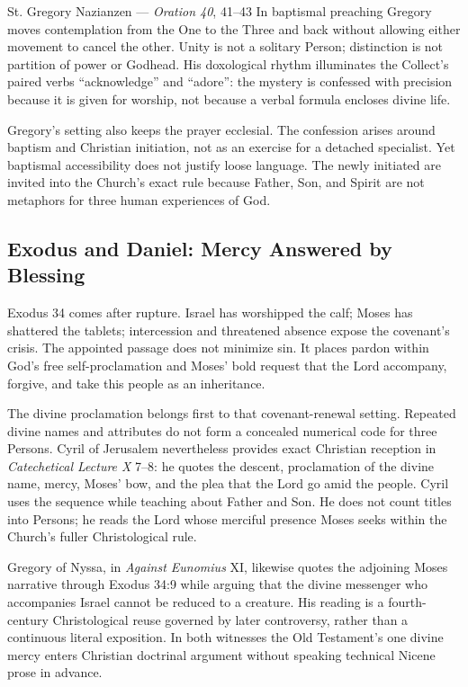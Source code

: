 \begin{sourcecard}{St. Gregory Nazianzen --- \emph{Oration 40}, 41--43}
In baptismal preaching Gregory moves contemplation from the One to the Three and back without allowing either movement to cancel the other. Unity is not a solitary Person; distinction is not partition of power or Godhead. His doxological rhythm illuminates the Collect's paired verbs “acknowledge” and “adore”: the mystery is confessed with precision because it is given for worship, not because a verbal formula encloses divine life.
\end{sourcecard}

Gregory's setting also keeps the prayer ecclesial. The confession arises around baptism and Christian initiation, not as an exercise for a detached specialist. Yet baptismal accessibility does not justify loose language. The newly initiated are invited into the Church's exact rule because Father, Son, and Spirit are not metaphors for three human experiences of God.

\subsection*{Exodus and Daniel: Mercy Answered by Blessing\enspace{}}

Exodus 34 comes after rupture. Israel has worshipped the calf; Moses has shattered the tablets; intercession and threatened absence expose the covenant's crisis. The appointed passage does not minimize sin. It places pardon within God's free self-proclamation and Moses' bold request that the Lord accompany, forgive, and take this people as an inheritance.

The divine proclamation belongs first to that covenant-renewal setting. Repeated divine names and attributes do not form a concealed numerical code for three Persons. Cyril of Jerusalem nevertheless provides exact Christian reception in \emph{Catechetical Lecture X} 7--8: he quotes the descent, proclamation of the divine name, mercy, Moses' bow, and the plea that the Lord go amid the people. Cyril uses the sequence while teaching about Father and Son. He does not count titles into Persons; he reads the Lord whose merciful presence Moses seeks within the Church's fuller Christological rule.

Gregory of Nyssa, in \emph{Against Eunomius} XI, likewise quotes the adjoining Moses narrative through Exodus 34:9 while arguing that the divine messenger who accompanies Israel cannot be reduced to a creature. His reading is a fourth-century Christological reuse governed by later controversy, rather than a continuous literal exposition. In both witnesses the Old Testament's one divine mercy enters Christian doctrinal argument without speaking technical Nicene prose in advance.

